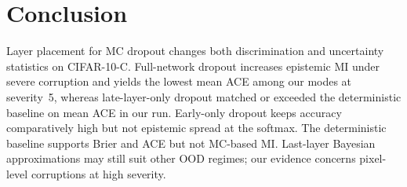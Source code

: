 \documentclass[10pt,twocolumn,letterpaper]{article}
\begin{document}
\section{Conclusion}

Layer placement for MC dropout changes both discrimination and uncertainty statistics on CIFAR-10-C. Full-network dropout increases epistemic MI under severe corruption and yields the lowest mean ACE among our modes at severity~5, whereas late-layer-only dropout matched or exceeded the deterministic baseline on mean ACE in our run. Early-only dropout keeps accuracy comparatively high but not epistemic spread at the softmax. The deterministic baseline supports Brier and ACE but not MC-based MI. Last-layer Bayesian approximations may still suit other OOD regimes; our evidence concerns pixel-level corruptions at high severity.

{\small


}
\end{document}
